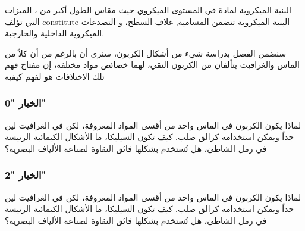 \documentclass[12pt,a4paper]{mathbook_arabic}
\newcommand\ee{\textenglish}
\begin{document}
\begin{demonstration}
 البنية الميكروية لمادة في المستوى الميكروي حيث مقاس الطول أكبر من 
، الميزات التي تؤلف constitute البنية الميكروية تتضمن المسامية, غلاف السطح، و التصدعات الميكروية الداخلية والخارجية.

سنضمن الفصل بدراسة شيء من أشكال     
الكربون، سنرى  أن بالرغم من أن كلاً من الماس والغرافيت يتألفان من الكربون النقي، لهما خصائص مواد مختلفة، إن مفتاح فهم تلك الاختلافات هو لفهم كيفية  
\end{demonstration}

\subsubsection{الخيار \ee{"0"}}



{\makeatletter
{}
\makeatother
\begin{demonstration}[0]
  لماذا يكون الكربون في الماس واحد من أقسى المواد المعروفة، لكن في الغرافيت لين جداً ويمكن استخدامه كزالق صلب.
     كيف تكون السيليكا، ما الأشكال الكيمائية الرئيسة في رمل الشاطئ، هل تُستخدم 
     بشكلها فائق النقاوة لصناعة الألياف البصرية؟
\end{demonstration}}


\subsubsection{الخيار \ee{"2"}}




\begin{demonstration}[2]
  لماذا يكون الكربون في الماس واحد من أقسى المواد المعروفة، لكن في الغرافيت لين جداً ويمكن استخدامه كزالق صلب.
     كيف تكون السيليكا، ما الأشكال الكيمائية الرئيسة في رمل الشاطئ، هل تُستخدم 
     بشكلها فائق النقاوة لصناعة الألياف البصرية؟
\end{demonstration}
\end{document}
